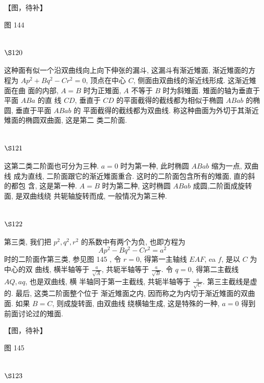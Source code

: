 【图，待补】

图 144 

\section{$\S 120$}

这种面有似一个沿双曲线向上向下伸张的漏斗, 这漏斗有渐近雉面, 渐近雉面的方 程为 $A p^{2}+B q^{2}-C r^{2}=0$, 顶点在中心 $C$, 侧面由双曲线的渐近线形成. 这渐近雉面在曲 面的内部, $A=B$ 时为正雉面, $A$ 不等于 $B$ 时为斜雉面. 雉面的轴为垂直于平面 $A B a$ 的直 线 $C D$, 垂直于 $C D$ 的平面截得的截线都为相似于椭圆 $A B a b$ 的椭圆, 垂直于平面 $A B a b$ 的 平面截得的截线都为双曲线. 称这种曲面为外切于其渐近雉面的椭圆双曲面, 这是第二 类二阶面. 

\section{$\S 121$}

这第二类二阶面也可分为三种. $a=0$ 时为第一种, 此时椭圆 $A B a b$ 缩为一点, 双曲线 成为直线, 二阶面跟它的渐近雉面重合. 这时的二阶面包含所有的雉面, 直的斜的都包 含, 这是第一种. $A=B$ 时为第二种, 这时椭圆 $A B a b$ 成圆,二阶面成旋转面, 是双曲线绕 共轭轴旋转而成, 一般情况为第三种.

\section{$\S 122$}

第三类, 我们把 $p^{2}, q^{2}, r^{2}$ 的系数中有两个为负, 也即方程为
\[
A p^{2}-B q^{2}-C r^{2}=a^{2}
\]
时的二阶面作第三类, 参见图 145 , 令 $r=0$, 得第一主轴线 $E A F$, ea $f$, 是以 $C$ 为中心的双 曲线, 横半轴等于 $\frac{a}{\sqrt{A}}$, 共轭半轴等于 $\frac{a}{\sqrt{B}}$. 令 $q=0$, 得第二主截线 $A Q, a q$, 也是双曲线, 横 半轴同于第一主截线, 共轭半轴等于 $\frac{a}{\sqrt{C}}$. 第三主截线是虚的. 最后, 这类二阶面整个位于 渐近雉面之内, 因而称之为内切于渐近雉面的双曲面. 如果 $B=C$, 则成旋转面, 由双曲线 绕横轴生成, 这是特殊的一种, $a=0$ 得到前面讨论过的雉面.


【图，待补】

图 145

\section{$\S 123$}

